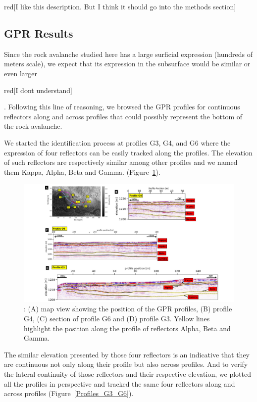 \documentclass[5p]{elsarticle}
\newcommand{\alon}{\begin{color}{red}}
\newcommand{\aloff}{\end{color}}
\begin{document}
\alon [I like this description. But I think it should go into the methods section] \aloff


		\subsection {GPR Results}
										
Since the rock avalanche studied here has a large surficial expression (hundreds of meters scale), we expect that its expression in the subsurface would be similar or even larger \alon [I dont understand] \aloff. Following this line of reasoning, we browsed the GPR profiles for continuous reflectors along and across profiles that could possibly represent the bottom of the rock avalanche. 

We started the identification process at profiles G3,  G4, and G6 where the expression of four reflectors can be easily tracked along the profiles. The elevation of such reflectors are respectively similar among other profiles and we named them Kappa, Alpha, Beta and Gamma. (Figure~\ref{Profiles_G3_G4_G6}). 

								 \begin{figure}[h]

	\includegraphics[width=\textwidth]{Figures/Profiles_G3_G4_G6.pdf}
		\caption{: (A) map view showing the position of the GPR profiles, (B) profile G4, (C) section of profile G6 and (D) profile G3. Yellow lines highlight the position along the profile of reflectors Alpha, Beta and Gamma. \label{Profiles_G3_G4_G6}}

								   \end{figure}
								   
The similar elevation presented by those four reflectors is an indicative that they are continuous not only along their profile but also across profiles. And to verify the lateral continuity of those reflectors and their respective elevation, we plotted all the profiles in perspective and tracked the same four reflectors along and across profiles (Figure~\ref{Profiles_G3_G6}).						   
								   
\end{document}
